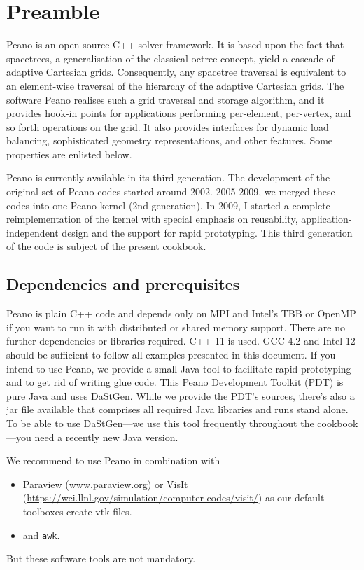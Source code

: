 \chapter{Preamble}


 Peano is an open source C++ solver framework. It is based upon the fact that spacetrees, a generalisation of the classical octree concept, yield a cascade of adaptive Cartesian grids. Consequently, any spacetree traversal is equivalent to an element-wise traversal of the hierarchy of the adaptive Cartesian grids. The software Peano realises such a grid traversal and storage algorithm, and it provides hook-in points for applications performing per-element, per-vertex, and so forth operations on the grid. It also provides interfaces for dynamic load balancing, sophisticated geometry representations, and other features. Some properties are enlisted below.

Peano is currently available in its third generation. 
The development of the original set of Peano codes started around 2002.
2005-2009, we merged these codes into one Peano kernel (2nd generation). 
In 2009, I started a complete reimplementation of the kernel with special
emphasis on reusability, application-independent design and the support for rapid prototyping. 
This third generation of the code is subject of the present cookbook.


\section*{Dependencies and prerequisites}

Peano is plain C++ code and depends only on MPI and Intel's TBB or OpenMP if you want to run it with distributed or shared memory support. 
There are no further dependencies or libraries required. 
C++ 11 is used. 
GCC 4.2 and Intel 12 should be sufficient to follow all examples presented in
this document.
If you intend to use Peano, we provide a small Java tool to facilitate rapid
prototyping and to get rid of writing glue code. 
This Peano Development Toolkit (PDT) is pure Java and uses DaStGen. 
While we provide the PDT's sources, there's also a jar file available that comprises all required Java libraries and runs stand alone.
To be able to use DaStGen---we use this tool frequently throughout the
cookbook---you need a recently new Java version.


We recommend to use Peano in combination with
\begin{itemize}
  \item Paraview (\url{www.paraview.org}) or VisIt
  (\url{https://wci.llnl.gov/simulation/computer-codes/visit/}) as our default
  toolboxes create vtk files.
  \item {} and \texttt{awk}.
\end{itemize}
But these software tools are not mandatory.


